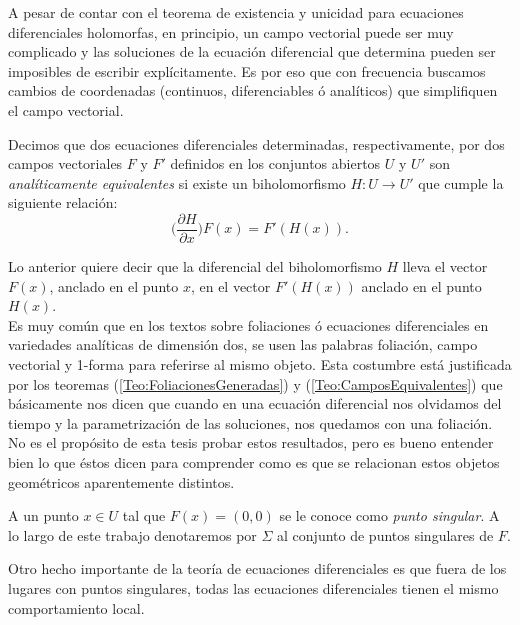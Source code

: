 A pesar de contar con el teorema de existencia y unicidad para ecuaciones diferenciales holomorfas, en principio, un campo vectorial puede ser muy complicado y las soluciones de la ecuación diferencial que determina pueden ser imposibles de escribir explícitamente. Es por eso que con frecuencia buscamos cambios de coordenadas (continuos, diferenciables ó analíticos) que simplifiquen el campo vectorial.

\begin{defn}
\label{Def:EquivalenciaAnalitica}
Decimos que dos ecuaciones diferenciales determinadas, respectivamente, por dos campos vectoriales $F$ y $F'$ definidos en los conjuntos abiertos $U$ y $U'$ son \emph{analíticamente equivalentes} si existe un biholomorfismo $H\colon U \rightarrow U'$ que cumple la siguiente relación:
\begin{equation}
\label{EquivalenciaAnalitica}
\Big(\frac{\partial H}{\partial x}\Big)F(x)=F'(H(x)).
\end{equation}
\end{defn}

Lo anterior quiere decir que la diferencial del biholomorfismo $H$ lleva el vector $F(x)$, anclado en el punto $x$, en el vector $F'(H(x))$ anclado en el punto $H(x)$.\\

Es muy común que en los textos sobre foliaciones ó ecuaciones diferenciales en variedades analíticas de dimensión dos, se usen las palabras foliación, campo vectorial y 1-forma para referirse al mismo objeto. Esta costumbre está justificada por los teoremas (\ref{Teo:FoliacionesGeneradas}) y (\ref{Teo:CamposEquivalentes}) que básicamente nos dicen que cuando en una ecuación diferencial nos olvidamos del tiempo y la parametrización de las soluciones, nos quedamos con una foliación. No es el propósito de esta tesis probar estos resultados, pero es bueno entender bien lo que éstos dicen para comprender como es que se relacionan estos objetos geométricos aparentemente distintos.\\
\begin{defn}
\label{Def:PuntoSingular}
A un punto $x\in U$ tal que $F(x)=(0,0)$ se le conoce como \emph{punto singular}. A lo largo de este trabajo denotaremos por $\Sigma$ al conjunto de puntos singulares de $F$.
\end{defn}
 Otro hecho importante de la teoría de ecuaciones diferenciales es que fuera de los lugares con puntos singulares, todas las ecuaciones diferenciales tienen el mismo comportamiento local.

